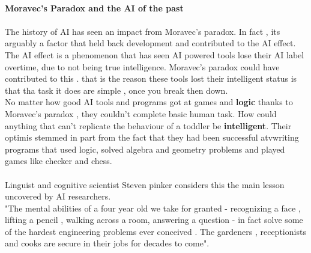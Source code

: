 \documentclass[a4 paper]{article}
\begin{document}
\paragraph{}
\textbf{Moravec's Paradox and the AI of the past}
\paragraph{}
The history of AI has seen an impact from Moravec's paradox. In fact , its arguably a factor that held back development and contributed to the AI effect.\\ The AI effect is a phenomenon that has seen AI powered tools lose their AI label overtime, due to not being true intelligence. Moravec's paradox could have contributed to this . that is the reason these tools lost their intelligent status is that tha task it does are simple , once you break then down.\\ No matter how good AI tools and programs got at games and \textbf{logic} thanks to Moravec's paradox , they couldn't complete basic human task. How could anything that can't replicate the behaviour of a toddler be \textbf{intelligent}. Their optimis stemmed in part from the fact that they had been successful atvwriting programs that used logic, solved algebra and geometry problems and played games like checker and chess. 
\paragraph{}
Linguist and cognitive scientist Steven pinker considers this the main lesson uncovered by AI researchers. \\ "The mental abilities of a four year old we take for granted - recognizing a face , lifting a pencil , walking across a room, answering a question - in fact solve some of the hardest engineering problems ever conceived . The gardeners , receptionists and cooks are secure in their jobs for decades to come". 
\end{document}
